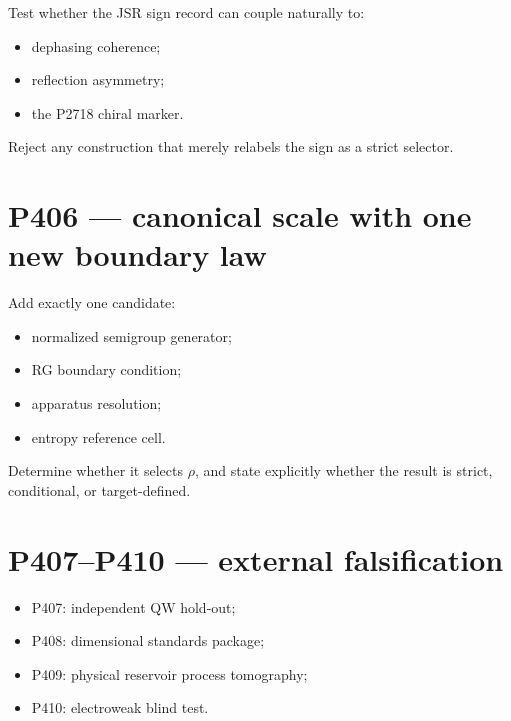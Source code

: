 \documentclass[11pt,a4paper,openany]{report}
\begin{document}
Test whether the JSR sign record can couple naturally to:

\begin{itemize}
\item 
dephasing coherence;

\item 
reflection asymmetry;

\item 
the P2718 chiral marker.

\end{itemize}

Reject any construction that merely relabels the sign as a strict selector.

\section{P406 --- canonical scale with one new boundary law}

Add exactly one candidate:

\begin{itemize}
\item 
normalized semigroup generator;

\item 
RG boundary condition;

\item 
apparatus resolution;

\item 
entropy reference cell.

\end{itemize}

Determine whether it selects \(\rho\), and state explicitly whether the result is strict, conditional, or target-defined.

\section{P407--P410 --- external falsification}

\begin{itemize}
\item 
P407: independent QW hold-out;

\item 
P408: dimensional standards package;

\item 
P409: physical reservoir process tomography;

\item 
P410: electroweak blind test.

\end{itemize}
\end{document}
